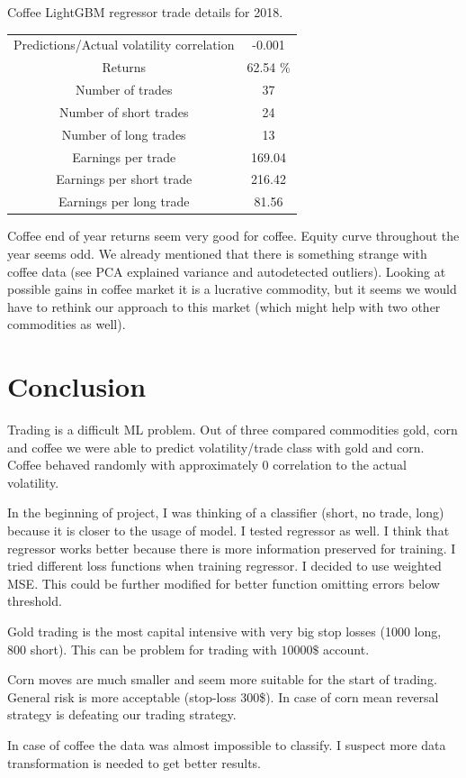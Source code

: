 \documentclass[final,2p]{elsarticle}
\begin{document}
Coffee LightGBM regressor trade details for 2018.
\begin{center}
    \begin{tabular}{c|c}
        Predictions/Actual volatility correlation&  -0.001\\
        Returns & 62.54 \%\\
        Number of trades&  37\\
        Number of short trades&  24\\
        Number of long trades&  13\\
        Earnings per trade&  169.04\\
        Earnings per short trade&  216.42\\
        Earnings per long trade&  81.56\\
    \end{tabular}
\end{center}

Coffee end of year returns seem very good for coffee. Equity curve throughout the year seems odd.
We already mentioned that there is something strange with coffee data (see PCA explained variance and autodetected outliers).
Looking at possible gains in coffee market it is a lucrative commodity, but it seems we would have
to rethink our approach to this market (which might help with two other commodities as well).

\section{Conclusion}

Trading is a difficult ML problem. Out of three compared commodities gold, corn and coffee we were able to predict volatility/trade class with gold and corn. Coffee behaved randomly with approximately 0 correlation to the actual volatility.

In the beginning of project, I was thinking of a classifier (short, no trade, long) because it is closer to the usage of model. I tested regressor as well. I think that regressor works better because there is more information preserved for training. I tried different loss functions when training regressor. I decided to use weighted MSE. This could be further modified for better function omitting errors below threshold.

Gold trading is the most capital intensive with very big stop losses (1000 long, 800 short). This can be problem for trading with $10 000\$$ account.

Corn moves are much smaller and seem more suitable for the start of trading. General risk is more acceptable (stop-loss 300\$). In case of corn mean reversal strategy is defeating our trading strategy.

In case of coffee the data was almost impossible to classify. I suspect more data transformation is needed to get better results.
\end{document}
